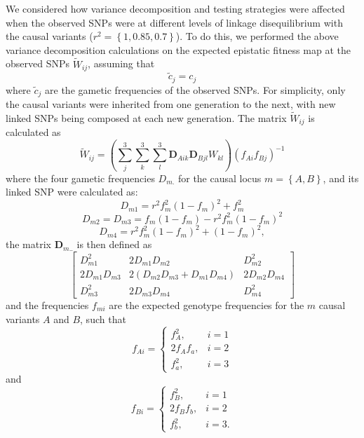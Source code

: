 We considered how variance decomposition and testing strategies were affected when the observed SNPs were at different levels of linkage disequilibrium with the causal variants ($r^2 = \left\{1,0.85,0.7\right\}$). To do this, we performed the above variance decomposition calculations on the expected epistatic fitness map at the observed SNPs $\tilde{W}_{ij}$, assuming that
\begin{equation}
\tilde{c}_{j} = c_{j}
\end{equation}
where $\tilde{c}_{j}$ are the gametic frequencies of the observed SNPs. For simplicity, only the causal variants were inherited from one generation to the next, with new linked SNPs being composed at each new generation. The matrix $\tilde{W}_{ij}$ is calculated as
\begin{equation}
\tilde{W}_{ij} = \left(\sum_j^3 \sum_k^3 \sum_l^3 \mathbf{D}_{Aik}\mathbf{D}_{Bjl}W_{kl}\right)\left(f_{Ai}f_{Bj}\right)^{-1}
\end{equation}
where the four gametic frequencies $D_{m.}$ for the causal locus $m=\left\{A,B\right\}$, and its linked SNP were calculated as:
\begin{equation}
D_{m1} = r^2f_m^2(1-f_m)^2+f_m^2
\end{equation}
\begin{equation}
D_{m2} = D_{m3} = f_m(1-f_m) - r^2f_m^2(1-f_m)^2
\end{equation}
\begin{equation}
D_{m4} = r^2f_m^2(1-f_m)^2+(1-f_m)^2,
\end{equation}
the matrix $\mathbf{D}_{m..}$ is then defined as
\begin{equation}
\left[
\begin{array}{ccc}
D_{m1}^2&	2D_{m1}D_{m2}&	D_{m2}^2\\
2D_{m1}D_{m3}&	2(D_{m2}D_{m3}+D_{m1}D_{m4})&	2D_{m2}D_{m4}\\
D_{m3}^2&	2D_{m3}D_{m4}&	D_{m4}^2\end{array}
\right]
\end{equation}
and the frequencies $f_{mi}$ are the expected genotype frequencies for the $m$ causal variants $A$ and $B$, such that
\begin{equation}
f_{Ai} = \left\{
\begin{array}{ll}
f_A^2,&i=1\\
2f_Af_a,&i = 2\\
f_a^2,&i = 3\end{array} \right.
\end{equation}
and
\begin{equation}
f_{Bi} = \left\{
\begin{array}{ll}
f_B^2,&i=1\\
2f_Bf_b,&i = 2\\
f_b^2,&i = 3.\end{array} \right.
\end{equation}

